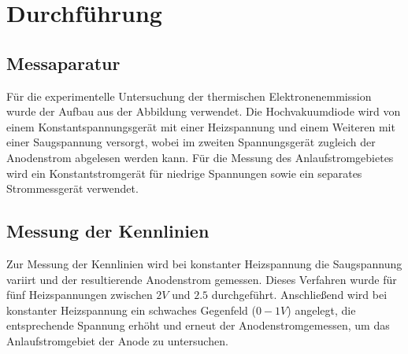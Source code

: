 \section{Durchführung}
\subsection{Messaparatur}
Für die experimentelle Untersuchung der thermischen Elektronenemmission wurde der Aufbau aus der Abbildung verwendet. Die Hochvakuumdiode wird 
von einem Konstantspannungsgerät mit einer Heizspannung und einem Weiteren mit einer Saugspannung versorgt, wobei im zweiten Spannungsgerät zugleich der Anodenstrom
abgelesen werden kann. Für die Messung des Anlaufstromgebietes wird ein Konstantstromgerät für niedrige Spannungen sowie ein separates Strommessgerät verwendet.
\subsection{Messung der Kennlinien}
Zur Messung der Kennlinien wird bei konstanter Heizspannung die Saugspannung variirt und der resultierende Anodenstrom gemessen. Dieses Verfahren wurde für 
fünf Heizspannungen zwischen $2 V$ und $2.5$ durchgeführt. Anschließend wird bei konstanter Heizspannung ein schwaches Gegenfeld ($0-1 V$) angelegt, die entsprechende 
Spannung erhöht und erneut der Anodenstromgemessen, um das Anlaufstromgebiet der Anode zu untersuchen.

